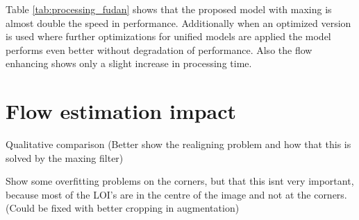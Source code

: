 Table \ref{tab:processing_fudan} shows that the proposed model with maxing is almost double the speed in performance. Additionally when an optimized version is used where further optimizations for unified models are applied the model performs even better without degradation of performance. Also the flow enhancing shows only a slight increase in processing time.


\section{Flow estimation impact}
Qualitative comparison (Better show the realigning problem and how that this is solved by the maxing filter)

Show some overfitting problems on the corners, but that this isnt very important, because most of the LOI's are in the centre of the image and not at the corners. (Could be fixed with better cropping in augmentation)